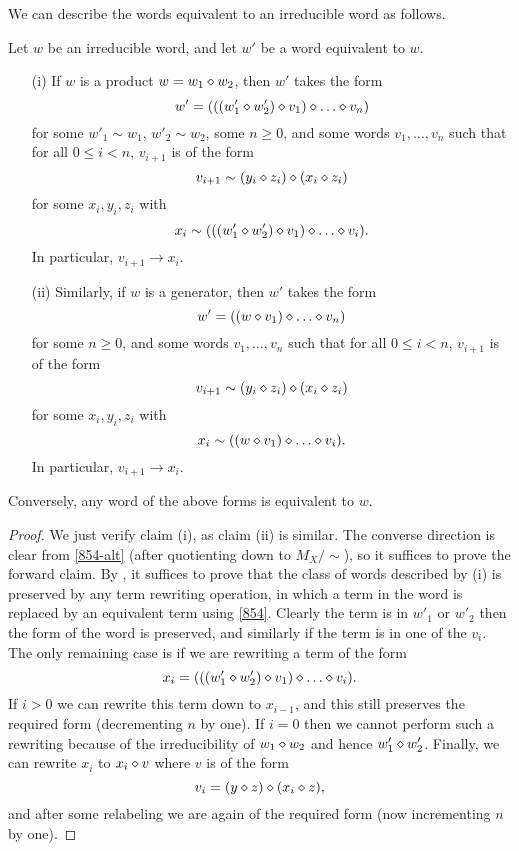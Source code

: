 We can describe the words equivalent to an irreducible word as follows.

\begin{theorem}\label{irred-desc}  Let $w$ be an irreducible word, and let $w'$ be a word equivalent to $w$.
  \begin{itemize}
    \item[(i)] If $w$ is a product $w = w_1 \diamond w_2$, then $w'$ takes the form
$$ w' = (((w'_1 \op w'_2) \op v_1) \op \dots \op v_n)$$
for some $w'_1 \sim w_1$, $w'_2 \sim w_2$, some $n \geq 0$, and some words $v_1, \dots, v_n$ such that for all $0 \leq i < n$, $v_{i+1}$ is of the form
$$ v_{i+1} \sim (y_i \diamond z_i) \diamond (x_i \diamond z_i)$$
for some $x_i, y_i, z_i$ with
$$ x_i \sim (((w'_1 \op w'_2) \op v_1) \op \dots \op v_i).$$
In particular, $v_{i+1} \to x_i$.
    \item[(ii)] Similarly, if $w$ is a generator, then $w'$ takes the form
$$ w' = ((w \op v_1) \op \dots \op v_n)$$
for some $n \geq 0$, and some words $v_1, \dots, v_n$ such that for all $0 \leq i < n$, $v_{i+1}$ is of the form
$$ v_{i+1} \sim (y_i \diamond z_i) \diamond (x_i \diamond z_i)$$
for some $x_i, y_i, z_i$ with
$$ x_i \sim ((w \op v_1) \op \dots \op v_i).$$
In particular, $v_{i+1} \to x_i$.
\end{itemize}
Conversely, any word of the above forms is equivalent to $w$.
\end{theorem}

\begin{proof}  We just verify claim (i), as claim (ii) is similar.  The converse direction is clear from \eqref{854-alt} (after quotienting down to $M_X/\sim$), so it suffices to prove the forward claim. By , it suffices to prove that the class of words described by (i) is preserved by any term rewriting operation, in which a term in the word is replaced by an equivalent term using \eqref{854}.  Clearly the term is in $w'_1$ or $w'_2$ then the form of the word is preserved, and similarly if the term is in one of the $v_i$.  The only remaining case is if we are rewriting a term of the form
$$ x_i = (((w'_1 \op w'_2) \op v_1) \op \dots \op v_i).$$
If $i>0$ we can rewrite this term down to $x_{i-1}$, and this still preserves the required form (decrementing $n$ by one).  If $i=0$ then we cannot perform such a rewriting because of the irreducibility of $w_1 \diamond w_2$ and hence $w'_1 \diamond w'_2$.  Finally, we can rewrite $x_i$ to $x_i \diamond v$ where $v$ is of the form
$$ v_i = (y \diamond z) \diamond (x_i \diamond z),$$
and after some relabeling we are again of the required form (now incrementing $n$ by one).
\end{proof}

